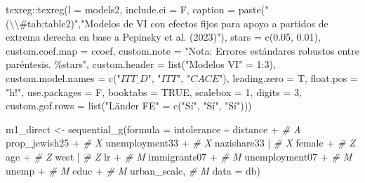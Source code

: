 \documentclass[
  12pt,
  a4paper,
]{article}
\newenvironment{Shaded}{\begin{snugshade}}{\end{snugshade}}
\newcommand{\AttributeTok}[1]{\textcolor[rgb]{0.77,0.63,0.00}{#1}}
\newcommand{\CommentTok}[1]{\textcolor[rgb]{0.56,0.35,0.01}{\textit{#1}}}
\newcommand{\ConstantTok}[1]{\textcolor[rgb]{0.00,0.00,0.00}{#1}}
\newcommand{\DecValTok}[1]{\textcolor[rgb]{0.00,0.00,0.81}{#1}}
\newcommand{\FloatTok}[1]{\textcolor[rgb]{0.00,0.00,0.81}{#1}}
\newcommand{\FunctionTok}[1]{\textcolor[rgb]{0.00,0.00,0.00}{#1}}
\newcommand{\NormalTok}[1]{#1}
\newcommand{\OtherTok}[1]{\textcolor[rgb]{0.56,0.35,0.01}{#1}}
\newcommand{\SpecialCharTok}[1]{\textcolor[rgb]{0.00,0.00,0.00}{#1}}
\newcommand{\StringTok}[1]{\textcolor[rgb]{0.31,0.60,0.02}{#1}}
\begin{document}
\begin{Shaded}
\begin{Highlighting}[]
\NormalTok{texreg}\SpecialCharTok{::}\FunctionTok{texreg}\NormalTok{(}\AttributeTok{l =}\NormalTok{ models2,}
               \AttributeTok{include.ci =}\NormalTok{ F,}
               \AttributeTok{caption =} \FunctionTok{paste}\NormalTok{(}\StringTok{"(}\SpecialCharTok{\textbackslash{}\textbackslash{}}\StringTok{\#tab:table2)"}\NormalTok{,}\StringTok{"Modelos de VI con efectos fijos para apoyo a partidos de extrema derecha en base a Pepinsky et al. (2023)"}\NormalTok{),}
               \AttributeTok{stars =} \FunctionTok{c}\NormalTok{(}\FloatTok{0.05}\NormalTok{, }\FloatTok{0.01}\NormalTok{),}
               \AttributeTok{custom.coef.map =}\NormalTok{ ccoef,}
               \AttributeTok{custom.note =} \StringTok{"Nota: Errores estándares robustos entre paréntesis. \%stars"}\NormalTok{,}
               \AttributeTok{custom.header =} \FunctionTok{list}\NormalTok{(}\StringTok{"Modelos VI"} \OtherTok{=} \DecValTok{1}\SpecialCharTok{:}\DecValTok{3}\NormalTok{),}
               \AttributeTok{custom.model.names =} \FunctionTok{c}\NormalTok{(}\StringTok{"$ITT\_D$"}\NormalTok{, }\StringTok{"$ITT$"}\NormalTok{, }\StringTok{"$CACE$"}\NormalTok{),}
               \AttributeTok{leading.zero =}\NormalTok{ T,}
               \AttributeTok{float.pos =} \StringTok{"h!"}\NormalTok{,}
               \AttributeTok{use.packages =}\NormalTok{ F,}
               \AttributeTok{booktabs =} \ConstantTok{TRUE}\NormalTok{,}
               \AttributeTok{scalebox =} \DecValTok{1}\NormalTok{,}
               \AttributeTok{digits =} \DecValTok{3}\NormalTok{,}
               \AttributeTok{custom.gof.rows =} \FunctionTok{list}\NormalTok{(}\StringTok{"Länder FE"} \OtherTok{=} \FunctionTok{c}\NormalTok{(}\StringTok{"Sí"}\NormalTok{, }\StringTok{"Sí"}\NormalTok{, }\StringTok{"Sí"}\NormalTok{)))}



\NormalTok{m1\_direct }\OtherTok{\textless{}{-}} \FunctionTok{sequential\_g}\NormalTok{(}\AttributeTok{formula =}\NormalTok{ intolerance }\SpecialCharTok{\textasciitilde{}}\NormalTok{ distance }\SpecialCharTok{+} \CommentTok{\# A }
\NormalTok{                           prop\_jewish25 }\SpecialCharTok{+}  \CommentTok{\# X}
\NormalTok{                           unemployment33 }\SpecialCharTok{+} \CommentTok{\# X}
\NormalTok{                           nazishare33 }\SpecialCharTok{|}    \CommentTok{\# X}
\NormalTok{                           female }\SpecialCharTok{+}         \CommentTok{\# Z}
\NormalTok{                           age }\SpecialCharTok{+}            \CommentTok{\# Z }
\NormalTok{                           west }\SpecialCharTok{|}           \CommentTok{\# Z}
\NormalTok{                           lr }\SpecialCharTok{+}             \CommentTok{\# M}
\NormalTok{                           immigrants07 }\SpecialCharTok{+}   \CommentTok{\# M}
\NormalTok{                           unemployment07 }\SpecialCharTok{+} \CommentTok{\# M}
\NormalTok{                           unemp }\SpecialCharTok{+}          \CommentTok{\# M}
\NormalTok{                           educ }\SpecialCharTok{+}           \CommentTok{\# M}
\NormalTok{                           urban\_scale,     }\CommentTok{\# M}
                         \AttributeTok{data =}\NormalTok{ db)}


\end{Highlighting}
\end{Shaded}
\end{document}
